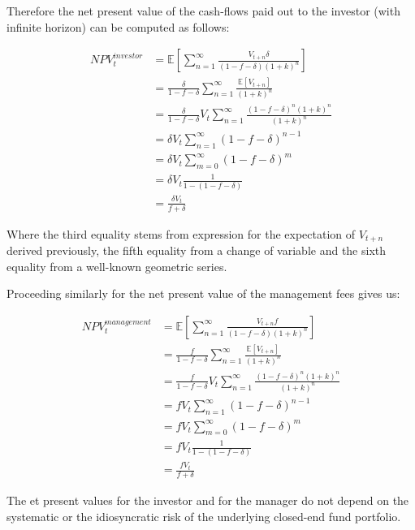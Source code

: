 \documentclass[10pt]{article}
\begin{document}
Therefore the net present value of the cash-flows paid out to the investor (with infinite horizon) can be computed as follows:

\begin{align*}
	NPV^{investor}_t &= \mathbb{E}\left[ \sum^\infty_{n=1} \frac{V_{t+n}\delta}{(1 - f - \delta)(1+k)^n} \right]\\
	&=\frac{\delta}{1 - f - \delta}\sum^\infty_{n=1} \frac{\mathbb{E}[V_{t+n}]}{(1+k)^n}\\
	&= \frac{\delta}{1 - f - \delta}V_t \sum^\infty_{n=1} \frac{(1-f-\delta)^n(1+k)^n}{(1+k)^n}\\
	&= \delta V_t \sum^\infty_{n=1}(1-f-\delta)^{n-1}\\
	&= \delta V_t \sum^\infty_{m=0}(1-f-\delta)^{m}\\
	&= \delta V_t \frac{1}{1 - (1 - f - \delta)}\\
	&= \frac{\delta V_t}{f + \delta}
\end{align*}

Where the third equality stems from expression for the expectation of $V_{t+n}$ derived previously, the fifth equality from a change of variable and the sixth equality from a well-known geometric series.

\smallbreak

Proceeding similarly for the net present value of the management fees gives us:

\begin{align*}
		NPV^{management}_t &= \mathbb{E}\left[ \sum^\infty_{n=1} \frac{V_{t+n}f}{(1 - f - \delta)(1+k)^n} \right]\\
	&=\frac{f}{1 - f - \delta}\sum^\infty_{n=1} \frac{\mathbb{E}[V_{t+n}]}{(1+k)^n}\\
	&= \frac{f}{1 - f - \delta}V_t \sum^\infty_{n=1} \frac{(1-f-\delta)^n(1+k)^n}{(1+k)^n}\\
	&= f V_t \sum^\infty_{n=1}(1-f-\delta)^{n-1}\\
	&= f V_t \sum^\infty_{m=0}(1-f-\delta)^{m}\\
	&= f V_t \frac{1}{1 - (1 - f - \delta)}\\
	&= \frac{f V_t}{f + \delta}
\end{align*}

The et present values for the investor and for the manager do not depend on the systematic or the idiosyncratic risk of the underlying closed-end fund portfolio. 
\end{document}
